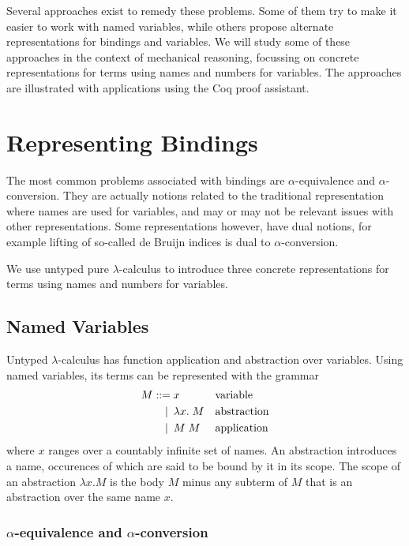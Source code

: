 \documentclass[a4paper,11pt]{article}
\begin{document}
Several approaches exist to remedy these problems.
Some of them try to make it easier to work with named variables, while
others propose alternate representations for bindings and variables.
We will study some of these approaches in the context of mechanical
reasoning, focussing on concrete representations for terms using names
and numbers for variables.
The approaches are illustrated with applications using the Coq proof
assistant.


\section{Representing Bindings}\label{sec:representing}

The most common problems associated with bindings are $\alpha$-equivalence
and $\alpha$-conversion.
They are actually notions related to the traditional representation where
names are used for variables, and may or may not be relevant issues with
other representations.
Some representations however, have dual notions, for example lifting of
so-called de Bruijn indices is dual to $\alpha$-conversion.

We use untyped pure $\lambda$-calculus to introduce three concrete
representations for terms using names and numbers for variables.


\subsection{Named Variables}

Untyped $\lambda$-calculus has function application and abstraction over
variables. Using named variables, its terms can be represented with the
grammar
\begin{align*}
  M ::=             &\; x
  && \text{variable} \\
  \llap{\textbar\:} &\; \lambda x. \; M
  && \text{abstraction} \\
  \llap{\textbar\:} &\; M \; M
  && \text{application}
\end{align*}
where $x$ ranges over a countably infinite set of names.
An abstraction introduces a name, occurences of which are said to be
bound by it in its scope. The scope of an abstraction $\lambda x.M$ is
the body $M$ minus any subterm of $M$ that is an abstraction over the
same name $x$.

\subsubsection*{$\alpha$-equivalence and $\alpha$-conversion}
\end{document}
